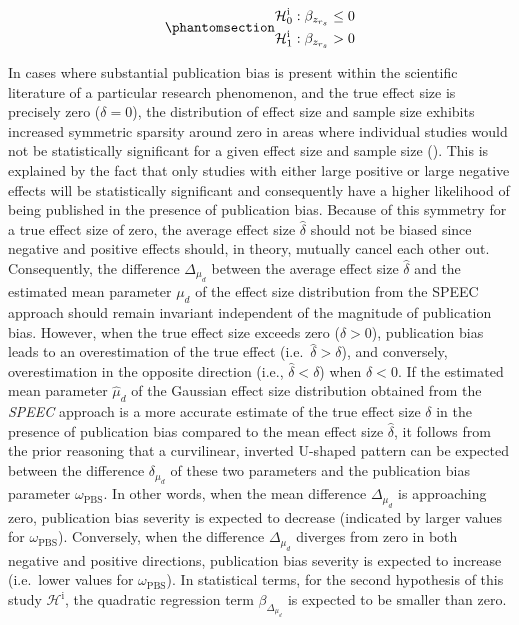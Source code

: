 \documentclass[
  12pt,
]{scrartcl}
\newcommand{\pbs}{\omega_{\text{PBS}}}
\newcommand{\hypothesis}[2]{\mathcal{H}^{\text{#1}}_{\text{#2}}}
\begin{document}
\begin{equation}\phantomsection\label{eq-h1}{
\begin{gathered}
\hypothesis{i}{0}: \beta_{z_{r_s}} \leq 0 \\
\hypothesis{i}{1}: \beta_{z_{r_s}} > 0
\end{gathered}
}\end{equation}

In cases where substantial publication bias is present within the
scientific literature of a particular research phenomenon, and the true
effect size is precisely zero (\(\delta=0\)), the distribution of effect
size and sample size exhibits increased symmetric sparsity around zero
in areas where individual studies would not be statistically significant
for a given effect size and sample size
(). This is
explained by the fact that only studies with either large positive or
large negative effects will be statistically significant and
consequently have a higher likelihood of being published in the presence
of publication bias. Because of this symmetry for a true effect size of
zero, the average effect size \(\widehat{\delta}\) should not be biased
since negative and positive effects should, in theory, mutually cancel
each other out. Consequently, the difference \(\Delta_{\mu_d}\) between
the average effect size \(\widehat{\delta}\) and the estimated mean
parameter \(\mu_d\) of the effect size distribution from the SPEEC
approach should remain invariant independent of the magnitude of
publication bias. However, when the true effect size exceeds zero
(\(\delta>0\)), publication bias leads to an overestimation of the true
effect (i.e.~\(\widehat{\delta}>\delta\)), and conversely,
overestimation in the opposite direction (i.e.,
\(\widehat{\delta} < \delta\)) when \(\delta<0\). If the estimated mean
parameter \(\widehat{\mu}_d\) of the Gaussian effect size distribution
obtained from the \emph{SPEEC} approach is a more accurate estimate of
the true effect size \(\delta\) in the presence of publication bias
compared to the mean effect size \(\widehat{\delta}\), it follows from
the prior reasoning that a curvilinear, inverted U-shaped pattern can be
expected between the difference \(\delta_{\mu_d}\) of these two
parameters and the publication bias parameter \(\pbs\). In other words,
when the mean difference \(\Delta_{\mu_d}\) is approaching zero,
publication bias severity is expected to decrease (indicated by larger
values for \(\pbs\)). Conversely, when the difference \(\Delta_{\mu_d}\)
diverges from zero in both negative and positive directions, publication
bias severity is expected to increase (i.e.~lower values for \(\pbs\)).
In statistical terms, for the second hypothesis of this study
\(\hypothesis{i}{}\), the quadratic regression term
\(\beta_{\Delta_{\mu_d}}\) is expected to be smaller than zero.
\end{document}
